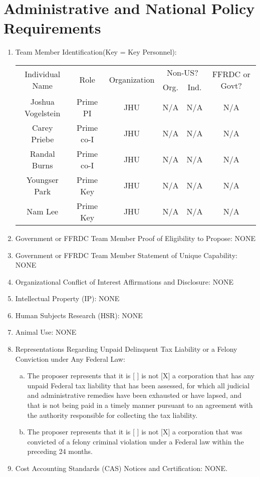 \section{Administrative and National Policy Requirements}



\begin{enumerate}[(1).]
\item Team Member Identification(Key = Key Personnel): 


\begin{tabular}{|c|c|c|c|c|c|}
\hline
\multirow{2}{*}{Individual Name} &
\multirow{2}{*}{Role} &
\multirow{2}{*}{Organization} & 
\multicolumn{2}{|c|}{Non-US?} & 
\multirow{2}{*}{FFRDC or Govt?} \\\cline{4-5}
 &   &  & Org. & Ind. &  \\\hline
Joshua Vogelstein 	& Prime PI & JHU & N/A & N/A & N/A \\\hline
Carey Priebe 		& Prime co-I & JHU& N/A & N/A & N/A \\\hline
Randal Burns 		& Prime co-I &JHU & N/A & N/A & N/A \\\hline
Youngser Park 		& Prime Key & JHU& N/A & N/A & N/A \\\hline
Nam Lee 			& Prime Key & JHU& N/A & N/A & N/A \\\hline
\end{tabular}

% 

\item Government or FFRDC Team Member Proof of Eligibility to Propose: NONE

\item Government or FFRDC Team Member Statement of Unique Capability: NONE


\item Organizational Conflict of Interest Affirmations and Disclosure: NONE

\item Intellectual Property (IP): NONE

\item Human Subjects Research (HSR): NONE

\item Animal Use: NONE

\item Representations Regarding Unpaid Delinquent Tax Liability or a Felony Conviction under Any Federal Law: 
\begin{enumerate}[(a)]
	\item The proposer represents that it is [ ] is not [X] a corporation that has any unpaid Federal tax liability that has been assessed, for which all judicial and administrative remedies have been exhausted or have lapsed, and that is not being paid in a timely manner pursuant to an agreement with the authority responsible for collecting the tax liability.
	\item The proposer represents that it is [ ] is not [X] a corporation that was convicted of a felony criminal violation under a Federal law within the preceding 24 months.
\end{enumerate}

\item Cost Accounting Standards (CAS) Notices and Certification: NONE.

\end{enumerate}
